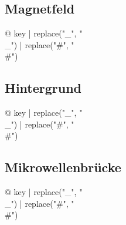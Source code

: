 \begin{multicols}{2}
\subsection{Magnetfeld}

\begin{description}
\item[{@ key | replace("_", "\\_") | replace("#", "\\#") }] %
\end{description}

\subsection{Hintergrund}

\begin{description}
\item[{@ key | replace("_", "\\_") | replace("#", "\\#") }] %
\end{description}

\subsection{Mikrowellenbrücke}

\begin{description}
\item[{@ key | replace("_", "\\_") | replace("#", "\\#") }] %
\end{description}


\end{multicols}
